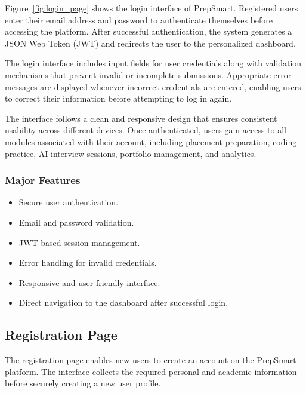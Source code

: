 Figure~\ref{fig:login_page} shows the login interface of PrepSmart. Registered users enter their email address and password to authenticate themselves before accessing the platform. After successful authentication, the system generates a JSON Web Token (JWT) and redirects the user to the personalized dashboard.

The login interface includes input fields for user credentials along with validation mechanisms that prevent invalid or incomplete submissions. Appropriate error messages are displayed whenever incorrect credentials are entered, enabling users to correct their information before attempting to log in again.

The interface follows a clean and responsive design that ensures consistent usability across different devices. Once authenticated, users gain access to all modules associated with their account, including placement preparation, coding practice, AI interview sessions, portfolio management, and analytics.

\subsubsection*{Major Features}

\begin{itemize}

\item Secure user authentication.

\item Email and password validation.

\item JWT-based session management.

\item Error handling for invalid credentials.

\item Responsive and user-friendly interface.

\item Direct navigation to the dashboard after successful login.

\end{itemize}

\subsection{Registration Page}

The registration page enables new users to create an account on the PrepSmart platform. The interface collects the required personal and academic information before securely creating a new user profile.

